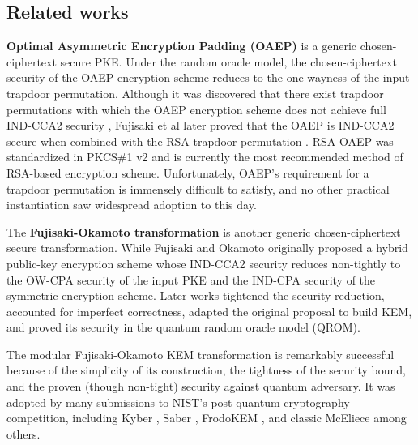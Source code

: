 \documentclass[journal=tches,submission]{iacrtrans}
\begin{document}
\subsection{Related works}
\textbf{Optimal Asymmetric Encryption Padding (OAEP)} \cite{DBLP:conf/eurocrypt/BellareR94}\cite{DBLP:conf/crypto/BellareDPR98} is a generic chosen-ciphertext secure PKE. Under the random oracle model, the chosen-ciphertext security of the OAEP encryption scheme reduces to the one-wayness of the input trapdoor permutation. Although it was discovered that there exist trapdoor permutations with which the OAEP encryption scheme does not achieve full IND-CCA2 security \cite{DBLP:journals/joc/Shoup02}, Fujisaki et al later proved that the OAEP is IND-CCA2 secure when combined with the RSA trapdoor permutation \cite{DBLP:conf/crypto/FujisakiOPS01}\cite{DBLP:journals/cacm/RivestSA78}. RSA-OAEP was standardized in PKCS\#1 v2 \cite{rfc8017} and is currently the most recommended method of RSA-based encryption scheme. Unfortunately, OAEP's requirement for a trapdoor permutation is immensely difficult to satisfy, and no other practical instantiation saw widespread adoption to this day.

The \textbf{Fujisaki-Okamoto transformation} \cite{DBLP:conf/crypto/FujisakiO99}\cite{DBLP:journals/joc/FujisakiO13} is another generic chosen-ciphertext secure transformation. While Fujisaki and Okamoto originally proposed a hybrid public-key encryption scheme whose IND-CCA2 security reduces non-tightly to the OW-CPA security of the input PKE and the IND-CPA security of the symmetric encryption scheme. Later works \cite{DBLP:conf/ima/Dent03}\cite{DBLP:conf/tcc/HofheinzHK17}\cite{DBLP:conf/eurocrypt/DworkNR04}\cite{DBLP:conf/asiacrypt/HovelmannsHM22}\cite{bernstein2018towards}  tightened the security reduction, accounted for imperfect correctness, adapted the original proposal to build KEM, and proved its security in the quantum random oracle model (QROM).

The modular Fujisaki-Okamoto KEM transformation is remarkably successful because of the simplicity of its construction, the tightness of the security bound, and the proven (though non-tight) security against quantum adversary. It was adopted by many submissions to NIST's post-quantum cryptography competition, including Kyber \cite{DBLP:conf/eurosp/BosDKLLSSSS18}, Saber \cite{DBLP:conf/africacrypt/DAnversKRV18}, FrodoKEM \cite{DBLP:conf/ccs/BosCDMNNRS16}, and classic McEliece \cite{classicmceliecespec} among others. 
\end{document}
